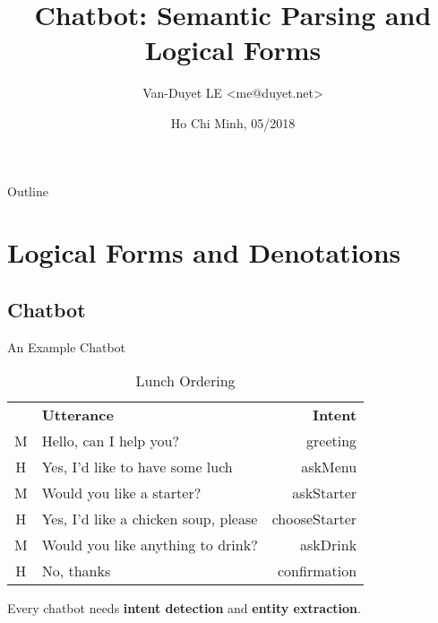 \documentclass{beamer}
\title{Chatbot: Semantic Parsing and Logical Forms}
\author{Van-Duyet LE \textless me@duyet.net\textgreater }
\date{Ho Chi Minh, 05/2018}
\begin{document}
\begin{frame}
  \titlepage
\end{frame}

\begin{frame}{Outline}
  \tableofcontents
\end{frame}

\section{Logical Forms and Denotations}

\subsection{Chatbot}

\begin{frame}{An Example Chatbot}

    \begin{example}
    
        \begin{table}[]
        \centering
        \caption{Lunch Ordering}
        \label{lunch-ordering}
        \begin{tabular}{clr}
          & \textbf{Utterance}                   & \textbf{Intent} \\
        M & Hello, can I help you?               & greeting        \\
        H & Yes, I'd like to have some luch      & askMenu         \\
        M & Would you like a starter?            & askStarter      \\
        H & Yes, I'd like a chicken soup, please & chooseStarter   \\
        M & Would you like anything to drink?    & askDrink        \\
        H & No, thanks                           & confirmation   
        \end{tabular}
        \end{table}
        
    \pause
    \end{example}
    
    
    Every chatbot needs \textbf{intent detection} and \textbf{entity extraction}.

\end{frame}
\end{document}
